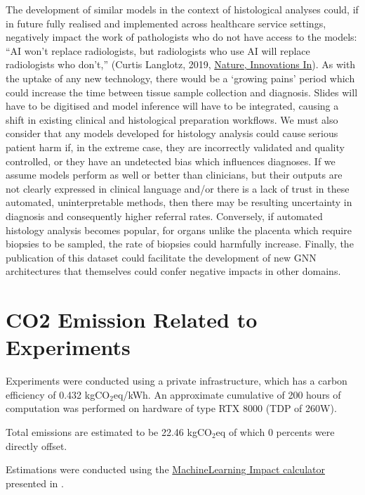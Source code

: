 \documentclass{article}
\begin{document}
The development of similar models in the context of histological analyses could, if in future fully realised and implemented across healthcare service settings, negatively impact the work of pathologists who do not have access to the models: “AI won’t replace radiologists, but radiologists who use AI will replace radiologists who don’t,” (Curtis Langlotz, 2019, \href{https://www.nature.com/articles/d41586-019-03847-z}{Nature, Innovations In}). As with the uptake of any new technology, there would be a ‘growing pains’ period which could increase the time between tissue sample collection and diagnosis. Slides will have to be digitised and model inference will have to be integrated, causing a shift in existing clinical and histological preparation workflows. We must also consider that any models developed for histology analysis could cause serious patient harm if, in the extreme case, they are incorrectly validated and quality controlled, or they have an undetected bias which influences diagnoses. If we assume models perform as well or better than clinicians, but their outputs are not clearly expressed in clinical language and/or there is a lack of trust in these automated, uninterpretable methods, then there may be resulting uncertainty in diagnosis and consequently higher referral rates. Conversely, if automated histology analysis becomes popular, for organs unlike the placenta which require biopsies to be sampled, the rate of biopsies could harmfully increase. Finally, the publication of this dataset could facilitate the development of new GNN architectures that themselves could confer negative impacts in other domains.


\section{CO2 Emission Related to Experiments}
\label{CO2}

Experiments were conducted using a private infrastructure, which has a carbon efficiency of 0.432 kgCO$_2$eq/kWh. An approximate cumulative of 200 hours of computation was performed on hardware of type RTX 8000 (TDP of 260W).

Total emissions are estimated to be 22.46 kgCO$_2$eq of which 0 percents were directly offset.

Estimations were conducted using the \href{https://mlco2.github.io/impact#compute}{MachineLearning Impact calculator} presented in \cite{lacoste_quantifying_2019}.
\end{document}

